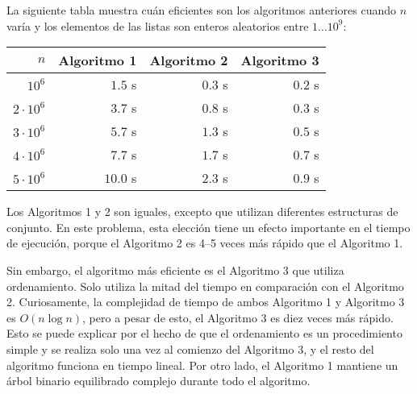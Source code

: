 La siguiente tabla muestra cuán eficientes
son los algoritmos anteriores cuando $n$ varía y
los elementos de las listas son enteros aleatorios
entre $1 \ldots 10^9$:

\begin{center}
    \begin{tabular}{rrrr}
        $n$            & Algoritmo 1 & Algoritmo 2 & Algoritmo 3 \\
        \hline
        $10^6$         & $1.5$ s     & $0.3$ s     & $0.2$ s     \\
        $2 \cdot 10^6$ & $3.7$ s     & $0.8$ s     & $0.3$ s     \\
        $3 \cdot 10^6$ & $5.7$ s     & $1.3$ s     & $0.5$ s     \\
        $4 \cdot 10^6$ & $7.7$ s     & $1.7$ s     & $0.7$ s     \\
        $5 \cdot 10^6$ & $10.0$ s    & $2.3$ s     & $0.9$ s     \\
    \end{tabular}
\end{center}

Los Algoritmos 1 y 2 son iguales, excepto que
utilizan diferentes estructuras de conjunto.
En este problema, esta elección tiene un efecto importante en
el tiempo de ejecución, porque el Algoritmo 2
es 4--5 veces más rápido que el Algoritmo 1.

Sin embargo, el algoritmo más eficiente es el Algoritmo 3
que utiliza ordenamiento.
Solo utiliza la mitad del tiempo en comparación con el Algoritmo 2.
Curiosamente, la complejidad de tiempo de ambos
Algoritmo 1 y Algoritmo 3 es $O(n \log n)$,
pero a pesar de esto, el Algoritmo 3 es diez veces más rápido.
Esto se puede explicar por el hecho de que
el ordenamiento es un procedimiento simple y se realiza
solo una vez al comienzo del Algoritmo 3,
y el resto del algoritmo funciona en tiempo lineal.
Por otro lado,
el Algoritmo 1 mantiene un árbol binario equilibrado complejo
durante todo el algoritmo.